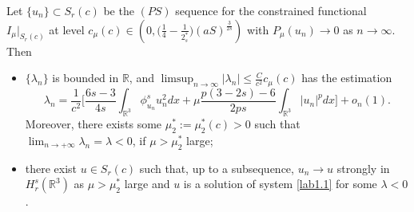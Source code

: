 \begin{lemma}\label{rem5.91} 
Let $\{u_n\} \subset S_r(c)$ be the  $(PS)$ sequence for the constrained functional
 $I_\mu|_{S_r(c)}$ at level 
 $c_\mu(c)\in \left(0, \Big(\frac{1}{4}-\frac{1}{2^*_s}\Big)(aS)^{\frac{3}{2s}}\right)$ 
with $P_\mu(u_n)\to 0$ as $n\to \infty$. Then
\begin{itemize}
\item[(i)] $\{\lambda_n\}$ is bounded in $\mathbb{R}$, and 
$\limsup_{n\to \infty}|\lambda_n|\leq \frac{C}{c^2}c_\mu(c)$ has the  
estimation
$$
\lambda_n=\frac{1}{c^2}\Big[\frac{6s-3}{4s}\int_{\mathbb{R}^3}\phi^s_{u_n} u^2_ndx
+\mu \frac{p(3-2s)-6}{2ps}\int_{\mathbb{R}^3}|u_n|^pdx\Big]+o_n(1).
$$
Moreover, there exists some $\mu^*_2:=\mu^*_2(c)>0$ such that 
$\lim_{n\to +\infty}\lambda_n=\lambda<0$, if $\mu> \mu^*_2$ large;

\item[(ii)] there exist $u\in S_r(c)$ such that, up to a subsequence, 
$u_n\to u$ strongly in $H^s_r(\mathbb{R}^3)$ as  $\mu> \mu^*_2$ large and 
$u$ is a solution of  system \eqref{lab1.1} for some $\lambda<0$.
\end{itemize}
\end{lemma}

